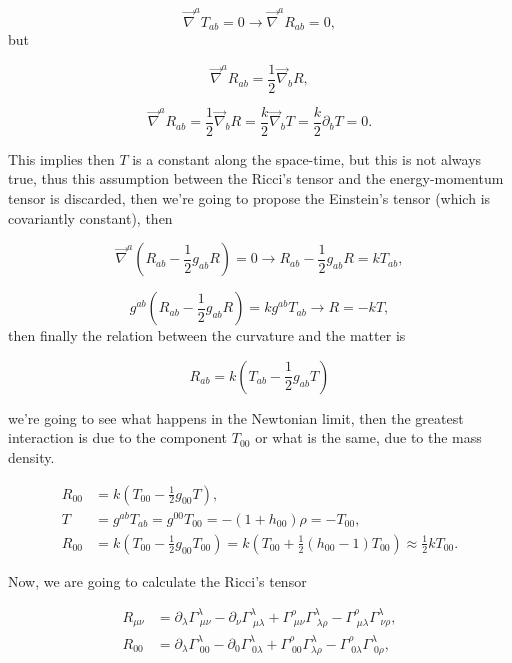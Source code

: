 \begin{equation}
    \Vec{\nabla}^aT_{ab}=0\rightarrow \Vec{\nabla}^aR_{ab}=0,
\end{equation}
but

\begin{equation}
    \Vec{\nabla}^aR_{ab} = \frac{1}{2}\Vec{\nabla}_bR,
\end{equation}

\begin{equation}
    \Vec{\nabla}^aR_{ab} = \frac{1}{2}\Vec{\nabla}_bR = \frac{k}{2}\Vec{\nabla}_bT = \frac{k}{2}\partial_b T=0.
\end{equation}

This implies then $T$ is a constant along the space-time, but this is not always true, thus this assumption between the Ricci's tensor and the energy-momentum tensor is discarded, then we're going to propose the Einstein's tensor (which is covariantly constant), then

\begin{equation}
    \Vec{\nabla}^a\left(R_{ab}-\frac{1}{2}g_{ab}R \right)=0 \rightarrow R_{ab}-\frac{1}{2}g_{ab}R=kT_{ab},
\end{equation}

\begin{equation}
    g^{ab}\left(R_{ab}-\frac{1}{2}g_{ab}R \right) = kg^{ab}T_{ab}\rightarrow R=-kT,
\end{equation}
then finally the relation between the curvature and the matter is

\begin{equation}
    R_{ab}=k\left(T_{ab}-\frac{1}{2}g_{ab}T \right)
\end{equation}

we're going to see what happens in the Newtonian limit, then the greatest interaction is due to the component $T_{00}$  or what is the same, due to the mass density.

\begin{align*}
    R_{00} &= k \left(T_{00}-\frac{1}{2}g_{00}T\right),\\
    T &= g^{ab}T_{ab} = g^{00}T_{00} = - \left(1+h_{00}\right)\rho=-T_{00},\\
    R_{00} &= k\left(T_{00} - \frac{1}{2}g_{00}T_{00} \right) = k \left(T_{00} + \frac{1}{2}\left(h_{00} - 1 \right)T_{00} \right) \approx \frac{1}{2}kT_{00}.
\end{align*}

Now, we are going to calculate the Ricci's tensor

\begin{align*}
    R_{\mu\nu} &= \partial_{\lambda}\Gamma^{\lambda}_{\;\mu\nu}- \partial_{\nu}\Gamma^{\lambda}_{\;\mu\lambda} + \Gamma^{\rho}_{\;\mu\nu}\Gamma^{\lambda}_{\;\lambda\rho} - \Gamma^{\rho}_{\;\mu\lambda}\Gamma^{\lambda}_{\;\nu\rho},\\
    R_{00} &= \partial_{\lambda}\Gamma^{\lambda}_{\;00}-\partial_0\Gamma^{\lambda}_{\;0\lambda} + \Gamma^{\rho}_{\;00}\Gamma^{\lambda}_{\lambda\rho} - \Gamma^{\rho}_{\;0\lambda}\Gamma^{\lambda}_{\;0\rho},
\end{align*}

